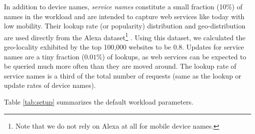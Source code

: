 


In addition to device names, {\em service names} constitute a small fraction (10\%) of names in the workload and are intended to capture web services like today with low mobility. Their lookup rate (or popularity) distribution and geo-distribution are used directly from the Alexa dataset\footnote{Note that we do not rely on Alexa at all for mobile device names.} \cite{alexa}. Using this dataset, we calculated the geo-locality exhibited by the top 100,000 websites to be 0.8. Updates for service names are a tiny fraction ($0.01\%$) of lookups, as web services can be expected to be queried much more often than they are moved around. The lookup rate of service names is a third of the total number of requests (same as the lookup or update rates of device names).


Table \ref{tab:setup} summarizes the default workload parameters.




